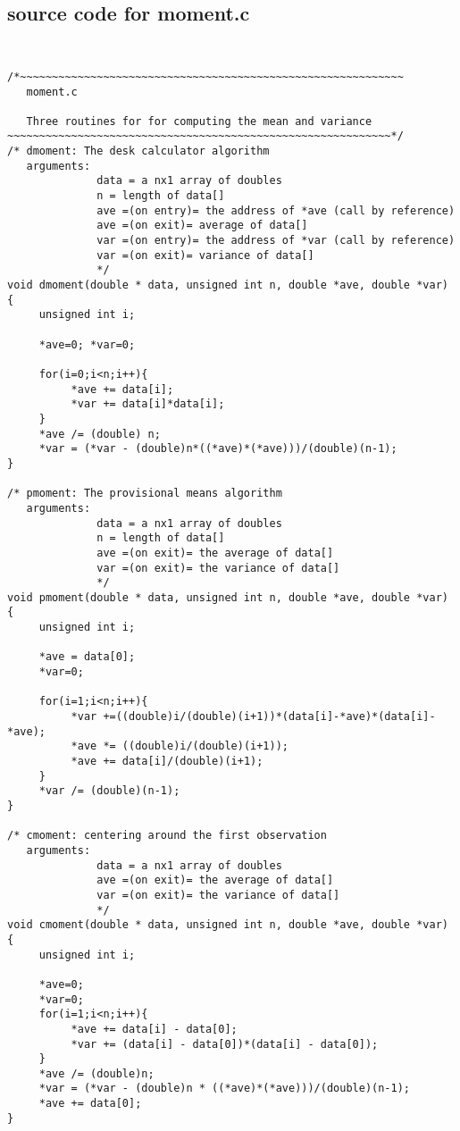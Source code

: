 \documentclass{article}
\begin{document}
\subsection{source code for moment.c}
\label{sec:moment}
{\tt
\begin{verbatim}
/*~~~~~~~~~~~~~~~~~~~~~~~~~~~~~~~~~~~~~~~~~~~~~~~~~~~~~~~~~~~~
   moment.c
  
   Three routines for for computing the mean and variance
~~~~~~~~~~~~~~~~~~~~~~~~~~~~~~~~~~~~~~~~~~~~~~~~~~~~~~~~~~~~*/
/* dmoment: The desk calculator algorithm
   arguments:
              data = a nx1 array of doubles
              n = length of data[]
              ave =(on entry)= the address of *ave (call by reference)
              ave =(on exit)= average of data[]
              var =(on entry)= the address of *var (call by reference)
              var =(on exit)= variance of data[]
              */
void dmoment(double * data, unsigned int n, double *ave, double *var)
{
     unsigned int i;
  
     *ave=0; *var=0;
  
     for(i=0;i<n;i++){
          *ave += data[i];
          *var += data[i]*data[i];
     }
     *ave /= (double) n;
     *var = (*var - (double)n*((*ave)*(*ave)))/(double)(n-1);
}

/* pmoment: The provisional means algorithm
   arguments:
              data = a nx1 array of doubles
              n = length of data[]
              ave =(on exit)= the average of data[]
              var =(on exit)= the variance of data[]
              */
void pmoment(double * data, unsigned int n, double *ave, double *var)
{
     unsigned int i;

     *ave = data[0];
     *var=0;
  
     for(i=1;i<n;i++){
          *var +=((double)i/(double)(i+1))*(data[i]-*ave)*(data[i]-*ave);
          *ave *= ((double)i/(double)(i+1));
          *ave += data[i]/(double)(i+1);
     }
     *var /= (double)(n-1);
}

/* cmoment: centering around the first observation 
   arguments:
              data = a nx1 array of doubles
              ave =(on exit)= the average of data[]
              var =(on exit)= the variance of data[]
              */
void cmoment(double * data, unsigned int n, double *ave, double *var)
{
     unsigned int i;
  
     *ave=0;
     *var=0;
     for(i=1;i<n;i++){
          *ave += data[i] - data[0];
          *var += (data[i] - data[0])*(data[i] - data[0]);
     }
     *ave /= (double)n;
     *var = (*var - (double)n * ((*ave)*(*ave)))/(double)(n-1);
     *ave += data[0];
}
\end{verbatim}
}
\end{document}
